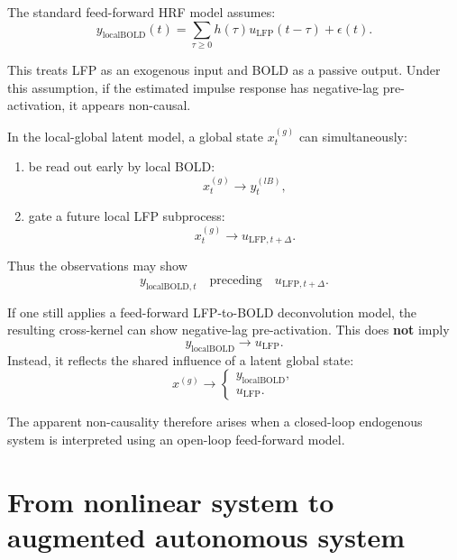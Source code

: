 \documentclass[11pt,a4paper]{article}
\begin{document}
The standard feed-forward HRF model assumes:
\begin{equation}
    y_{\mathrm{localBOLD}}(t)
    =
    \sum_{\tau\ge 0} h(\tau) u_{\mathrm{LFP}}(t-\tau)+\epsilon(t).
\end{equation}

This treats LFP as an exogenous input and BOLD as a passive output. Under this assumption, if the estimated impulse response has negative-lag pre-activation, it appears non-causal.

In the local-global latent model, a global state $x_t^{(g)}$ can simultaneously:
\begin{enumerate}
    \item be read out early by local BOLD:
    \begin{equation}
        x_t^{(g)} \rightarrow y_t^{(lB)},
    \end{equation}
    \item gate a future local LFP subprocess:
    \begin{equation}
        x_t^{(g)} \rightarrow u_{\mathrm{LFP},t+\Delta}.
    \end{equation}
\end{enumerate}

Thus the observations may show
\begin{equation}
    y_{\mathrm{localBOLD},t}
    \quad \text{preceding} \quad
    u_{\mathrm{LFP},t+\Delta}.
\end{equation}

If one still applies a feed-forward LFP-to-BOLD deconvolution model, the resulting cross-kernel can show negative-lag pre-activation. This does \textbf{not} imply
\begin{equation}
    y_{\mathrm{localBOLD}} \rightarrow u_{\mathrm{LFP}}.
\end{equation}
Instead, it reflects the shared influence of a latent global state:
\begin{equation}
    x^{(g)} \rightarrow
    \begin{cases}
    y_{\mathrm{localBOLD}},\\
    u_{\mathrm{LFP}}.
    \end{cases}
\end{equation}

The apparent non-causality therefore arises when a closed-loop endogenous system is interpreted using an open-loop feed-forward model.

\section{From nonlinear system to augmented autonomous system}
\end{document}
